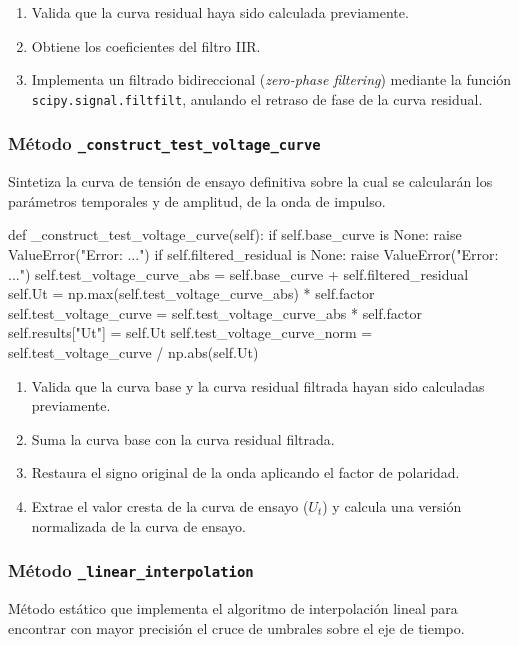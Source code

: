 \begin{enumerate}
    \item Valida que la curva residual haya sido calculada previamente.
    \item Obtiene los coeficientes del filtro IIR.
    \item Implementa un filtrado bidireccional (\textit{zero-phase filtering}) mediante la función \texttt{scipy.signal.filtfilt}, anulando el retraso de fase de la curva residual.
\end{enumerate}

\subsubsection{Método \texttt{\_construct\_test\_voltage\_curve}}
Sintetiza la curva de tensión de ensayo definitiva sobre la cual se calcularán los parámetros temporales y de amplitud, de la onda de impulso.

\begin{python}
def _construct_test_voltage_curve(self):
    if self.base_curve is None:
        raise ValueError("Error: ...")
    if self.filtered_residual is None:
        raise ValueError("Error: ...")
    self.test_voltage_curve_abs = self.base_curve + self.filtered_residual
    self.Ut = np.max(self.test_voltage_curve_abs) * self.factor
    self.test_voltage_curve = self.test_voltage_curve_abs * self.factor
    self.results["Ut"] = self.Ut
    self.test_voltage_curve_norm = self.test_voltage_curve / np.abs(self.Ut)
\end{python}

\begin{enumerate}
    \item Valida que la curva base y la curva residual filtrada hayan sido calculadas previamente.
    \item Suma la curva base con la curva residual filtrada.
    \item Restaura el signo original de la onda aplicando el factor de polaridad.
    \item Extrae el valor cresta de la curva de ensayo ($U_t$) y calcula una versión normalizada de la curva de ensayo.
\end{enumerate}

\subsubsection{Método \texttt{\_linear\_interpolation}}
Método estático que implementa el algoritmo de interpolación lineal para encontrar con mayor precisión el cruce de umbrales sobre el eje de tiempo.

